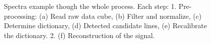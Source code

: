 \begin{figure}
\begin{center}
{			\label{fig:e}
		}
		\caption{Spectra example though the whole process. Each step: 1. Pre-processing: (a) Read raw data cube, (b) Filter and normalize, (c) Determine dictionary, (d) Detected candidate lines, (e) Recalibrate the dictionary. 2. (f) Reconstruction of the signal.}
	\end{center}
\end{figure}

